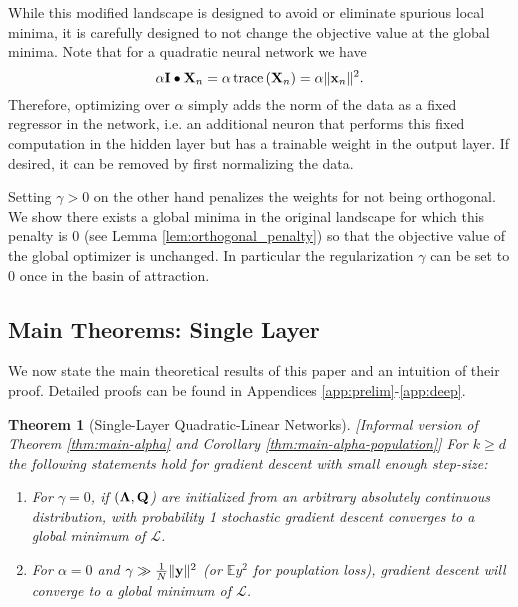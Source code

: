 \documentclass[11pt]{article}
\theoremstyle{plain}
\newtheorem{theorem}{Theorem}
\DeclareMathOperator*{\trace}{trace}
\theoremstyle{plain}
\numberwithin{equation}{section}
\numberwithin{lemma}{section}
\numberwithin{theorem}{section}
\numberwithin{corollary}{section}
\numberwithin{observation}{section}
\numberwithin{definition}{section}
\numberwithin{example}{section}
\begin{document}
While this modified landscape is designed to avoid or eliminate spurious local minima, it is carefully designed to not change the objective value at the global minima.  Note that for a quadratic neural network we have
\begin{equation}
    \alpha \Mx{I} \bullet \Mx{X}_n = \alpha \trace \left( \Mx{X}_n \right)= \alpha \|\V{x}_n\|^2.
\end{equation}
Therefore, optimizing over $\alpha$ simply adds the norm of the data as a fixed regressor in the network, i.e. an additional neuron that performs this fixed computation in the hidden layer but has a trainable weight in the output layer.  If desired, it can be removed by first normalizing the data.

Setting $\gamma > 0$ on the other hand penalizes the weights for not being orthogonal. We show there exists a global minima in the original landscape for which this penalty is 0 (see Lemma \ref{lem:orthogonal_penalty}) so that the objective value of the global optimizer is unchanged. In particular the regularization $\gamma$ can be set to 0 once in the basin of attraction.

\subsection{Main Theorems: Single Layer}
We now state the main theoretical results of this paper and an intuition of their proof. Detailed proofs can be found in Appendices \ref{app:prelim}-\ref{app:deep}.

\begin{theorem} [Single-Layer Quadratic-Linear Networks] \label{thm:main_text:main} [Informal version of Theorem \ref{thm:main-alpha} and Corollary \ref{thm:main-alpha-population}] For $k \geq d$ the following statements hold for gradient descent with small enough step-size: 
\begin{enumerate}
    \item For $\gamma = 0$, if $(\Mx{\Lambda},\Mx{Q}$) are initialized from an arbitrary absolutely continuous distribution, with probability 1 stochastic gradient descent converges to a global minimum of $\mathcal{L}$.
    \item For $\alpha = 0$ and $\gamma \gg \frac{1}{N} \|\V{y}\|^2$ (or $\mathbb{E} y^2$ for pouplation loss),  gradient descent will converge to a global minimum of $\mathcal{L}$.
\end{enumerate}
\end{theorem}
\end{document}
